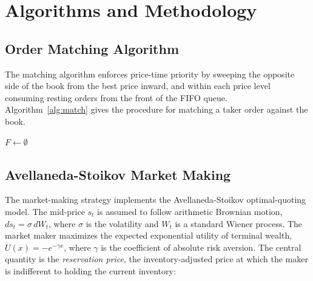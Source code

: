 \documentclass[12pt,oneside,a4paper]{report}
\begin{document}
\section{Algorithms and Methodology}
\label{sec:algorithms}

\subsection{Order Matching Algorithm}

The matching algorithm enforces price-time priority by sweeping the opposite side of the book from the best price inward, and within each price level consuming resting orders from the front of the FIFO queue. Algorithm~\ref{alg:match} gives the procedure for matching a taker order against the book.

\begin{algorithm}[H]
\caption{Match a taker order against the book}
\label{alg:match}
\SetAlgoLined
{}
$F \leftarrow \emptyset$\;
\;
\end{algorithm}

\subsection{Avellaneda-Stoikov Market Making}

The market-making strategy implements the Avellaneda-Stoikov optimal-quoting model. The mid-price $s_t$ is assumed to follow arithmetic Brownian motion, $ds_t = \sigma\, dW_t$, where $\sigma$ is the volatility and $W_t$ is a standard Wiener process. The market maker maximizes the expected exponential utility of terminal wealth, $U(x) = -e^{-\gamma x}$, where $\gamma$ is the coefficient of absolute risk aversion. The central quantity is the \emph{reservation price}, the inventory-adjusted price at which the maker is indifferent to holding the current inventory:
\end{document}
